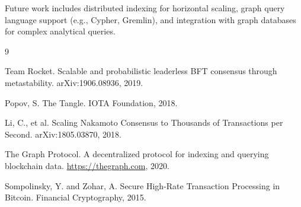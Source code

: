 \documentclass[11pt,twocolumn]{article}
\begin{document}
Future work includes distributed indexing for horizontal scaling, graph query language support (e.g., Cypher, Gremlin), and integration with graph databases for complex analytical queries.


\begin{thebibliography}{9}

Team Rocket. Scalable and probabilistic leaderless BFT consensus through metastability. arXiv:1906.08936, 2019.

Popov, S. The Tangle. IOTA Foundation, 2018.

Li, C., et al. Scaling Nakamoto Consensus to Thousands of Transactions per Second. arXiv:1805.03870, 2018.

The Graph Protocol. A decentralized protocol for indexing and querying blockchain data. \url{https://thegraph.com}, 2020.

Sompolinsky, Y. and Zohar, A. Secure High-Rate Transaction Processing in Bitcoin. Financial Cryptography, 2015.

\end{thebibliography}
\end{document}
